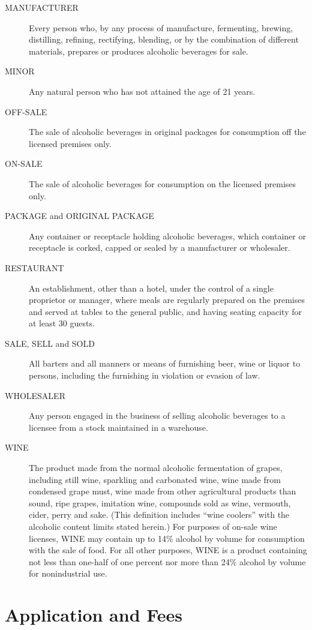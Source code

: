 \begin{description}
    \item[MANUFACTURER] Every person who, by any process of manufacture, fermenting, brewing, distilling, refining, rectifying, blending, or by the combination of different materials, prepares or produces alcoholic beverages for sale.
    \item[MINOR] Any natural person who has not attained the age of 21 years.
    \item[OFF-SALE] The sale of alcoholic beverages in original packages for consumption off the licensed premises only.
    \item[ON-SALE] The sale of alcoholic beverages for consumption on the licensed premises only.\
    \item[PACKAGE and ORIGINAL PACKAGE] Any container or receptacle holding alcoholic beverages, which container or receptacle is corked, capped or sealed by a manufacturer or wholesaler.
    \item[RESTAURANT] An establishment, other than a hotel, under the control of a single proprietor or manager, where meals are regularly prepared on the premises and served at tables to the general public, and having seating capacity for at least 30 guests.
    \item[SALE, SELL and SOLD] All barters and all manners or means of furnishing beer, wine or liquor to persons, including the furnishing in violation or evasion of law.
    \item[WHOLESALER] Any person engaged in the business of selling alcoholic beverages to a licensee from a stock maintained in a warehouse.
    \item[WINE] The product made from the normal alcoholic fermentation of grapes, including still wine, sparkling and carbonated wine, wine made from condensed grape must, wine made from other agricultural products than sound, ripe grapes, imitation wine, compounds sold as wine, vermouth, cider, perry and sake. (This definition includes “wine coolers” with the alcoholic content limits stated herein.) For purposes of on-sale wine licenses, WINE may contain up to 14\% alcohol by volume for consumption with the sale of food.  For all other purposes, WINE is a product containing not less than one-half of one percent nor more than 24\% alcohol by volume for nonindustrial use.
\end{description}


\setcounter{section}{14}
\section{Application and Fees}
